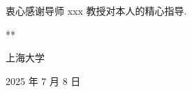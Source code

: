 \begin{acknowledgement}
  衷心感谢导师 xxx 教授对本人的精心指导. 

  \vspace{50bp}

  \hfill ***

  \hfill 上海大学

  \hfill 2025 年 7 月 8 日

\end{acknowledgement}
